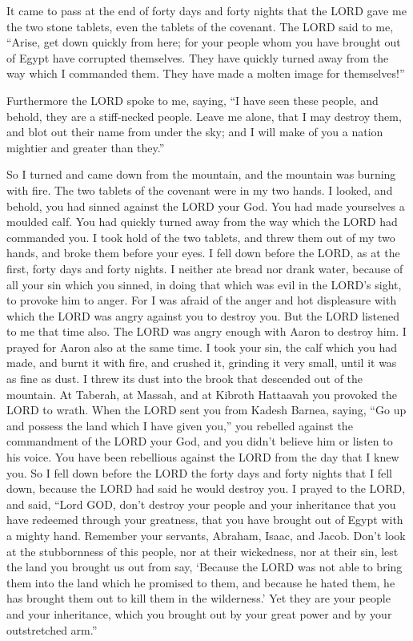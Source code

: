  It came to pass at the end of forty days and forty
nights that the LORD gave me the two stone tablets, even the tablets of
the covenant.  The LORD said to me, ``Arise, get down
quickly from here; for your people whom you have brought out of Egypt
have corrupted themselves. They have quickly turned away from the way
which I commanded them. They have made a molten image for themselves!''

 Furthermore the LORD spoke to me, saying, ``I have seen
these people, and behold, they are a stiff-necked people.
 Leave me alone, that I may destroy them, and blot out
their name from under the sky; and I will make of you a nation mightier
and greater than they.''

 So I turned and came down from the mountain, and the
mountain was burning with fire. The two tablets of the covenant were in
my two hands.  I looked, and behold, you had sinned
against the LORD your God. You had made yourselves a moulded calf. You
had quickly turned away from the way which the LORD had commanded you.
 I took hold of the two tablets, and threw them out of my
two hands, and broke them before your eyes.  I fell down
before the LORD, as at the first, forty days and forty nights. I neither
ate bread nor drank water, because of all your sin which you sinned, in
doing that which was evil in the LORD's sight, to provoke him to anger.
 For I was afraid of the anger and hot displeasure with
which the LORD was angry against you to destroy you. But the LORD
listened to me that time also.  The LORD was angry enough
with Aaron to destroy him. I prayed for Aaron also at the same time.
 I took your sin, the calf which you had made, and burnt
it with fire, and crushed it, grinding it very small, until it was as
fine as dust. I threw its dust into the brook that descended out of the
mountain.  At Taberah, at Massah, and at Kibroth
Hattaavah you provoked the LORD to wrath.  When the LORD
sent you from Kadesh Barnea, saying, ``Go up and possess the land which
I have given you,'' you rebelled against the commandment of the LORD
your God, and you didn't believe him or listen to his voice.
 You have been rebellious against the LORD from the day
that I knew you.  So I fell down before the LORD the
forty days and forty nights that I fell down, because the LORD had said
he would destroy you.  I prayed to the LORD, and said,
``Lord GOD, don't destroy your people and your inheritance that you have
redeemed through your greatness, that you have brought out of Egypt with
a mighty hand.  Remember your servants, Abraham, Isaac,
and Jacob. Don't look at the stubbornness of this people, nor at their
wickedness, nor at their sin,  lest the land you brought
us out from say, `Because the LORD was not able to bring them into the
land which he promised to them, and because he hated them, he has
brought them out to kill them in the wilderness.'  Yet
they are your people and your inheritance, which you brought out by your
great power and by your outstretched arm.''

